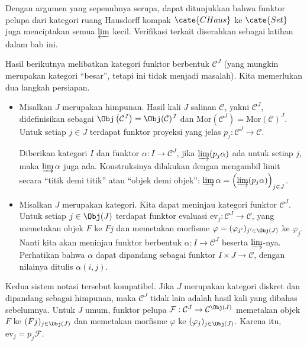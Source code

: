 Dengan argumen yang sepenuhnya serupa, dapat ditunjukkan bahwa funktor pelupa
dari kategori ruang Hausdorff kompak $\cate{CHaus}$ ke $\cate{Set}$ juga
menciptakan semua $\varprojlim$ kecil. Verifikasi terkait diserahkan sebagai
latihan dalam bab ini.

Hasil berikutnya melibatkan kategori funktor berbentuk $\mathcal{C}^J$
(yang mungkin merupakan kategori ``besar'', tetapi ini tidak menjadi masalah).
Kita memerlukan dua langkah persiapan.

\begin{itemize}
	\item Misalkan $J$ merupakan himpunan. Hasil kali $J$ salinan
	$\mathcal{C}$, yakni $\mathcal{C}^J$, didefinisikan sebagai
	$\Obj\left(\mathcal{C}^J\right) = \Obj(\mathcal{C})^J$ dan
	$\mathrm{Mor}\left(\mathcal{C}^J \right) = \mathrm{Mor}(\mathcal{C})^J$.
	Untuk setiap $j \in J$ terdapat funktor proyeksi yang jelas
	$p_j: \mathcal{C}^J \to \mathcal{C}$.

	Diberikan kategori $I$ dan funktor $\alpha: I \to \mathcal{C}^J$, jika
	$\varinjlim (p_j \alpha)$ ada untuk setiap $j$, maka
	$\varinjlim \alpha$ juga ada. Konstruksinya dilakukan dengan mengambil limit
	secara ``titik demi titik'' atau ``objek demi objek'':
	$\varinjlim \alpha = \left( \varinjlim (p_j \alpha) \right)_{j \in J}$.

	\item Misalkan $J$ merupakan kategori. Kita dapat meninjau kategori funktor
	$\mathcal{C}^J$. Untuk setiap $j \in \Obj(J)$ terdapat funktor evaluasi
	$\mathrm{ev}_j: \mathcal{C}^J \to \mathcal{C}$, yang memetakan objek $F$
	ke $Fj$ dan memetakan morfisme
	$\varphi = (\varphi_{j'})_{j' \in \Obj(J)}$ ke $\varphi_j$. Nanti kita akan
	meninjau funktor berbentuk $\alpha: I \to \mathcal{C}^J$ beserta
	$\varinjlim$-nya. Perhatikan bahwa $\alpha$ dapat dipandang sebagai funktor
	$I \times J \to \mathcal{C}$, dengan nilainya ditulis $\alpha(i, j)$.
\end{itemize}

Kedua sistem notasi tersebut kompatibel. Jika $J$ merupakan kategori diskret
dan dipandang sebagai himpunan, maka $\mathcal{C}^J$ tidak lain adalah hasil
kali yang dibahas sebelumnya. Untuk $J$ umum, funktor pelupa
$\mathcal{F}: \mathcal{C}^J \to \mathcal{C}^{\Obj(J)}$ memetakan objek $F$ ke
$(Fj)_{j \in \Obj(J)}$ dan memetakan morfisme $\varphi$ ke
$(\varphi_j)_{j \in \Obj(J)}$. Karena itu, $\mathrm{ev}_j = p_j \mathcal{F}$.

